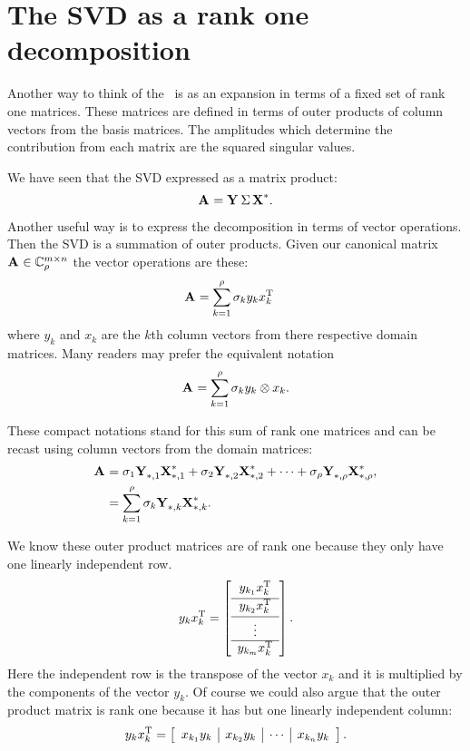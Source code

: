 \section{The SVD as a rank one decomposition}

Another way to think of the \svdp \ is as an expansion in terms of a fixed set of rank one matrices. These matrices are defined in terms of outer products of column vectors from the basis matrices. The amplitudes which determine the contribution from each matrix are the squared singular values.

We have seen that the SVD expressed as a matrix product:
\begin{equation*}
  \svdax{*}.
\end{equation*}

Another useful way is to express the decomposition in terms of vector operations. Then the SVD is a summation of outer products. Given our canonical matrix $\Accmn_{\rho}$ the vector operations are these:
\begin{equation}
  \begin{split}
    \A{} & = \sum_{k=1}^{\rho}{\sigma_{k}y_{k}x_{k}^{\mathrm{T}}}
  \end{split}
\end{equation}
where $y_{k}$ and $x_{k}$ are the $k$th column vectors from there respective domain matrices. 
Many readers may prefer the equivalent notation
\begin{equation}
  \A{} = \sum_{k=1}^{\rho}{\sigma_{k}y_{k}\otimes x_{k}}.
\end{equation}

These compact notations stand for this sum of rank one matrices and can be recast using column vectors from the domain matrices:
\begin{equation}
  \begin{split}
    \A{} &= \sigma_{1} \Y{}_{*,1}\X{*}_{*,1} + \sigma_{2} \Y{}_{*,2}\X{*}_{*,2} + \dots + \sigma_{\rho} \Y{}_{*,\rho}\X{*}_{*,\rho},\\
         &= \sum_{k=1}^{\rho}{\sigma_{k}\Y{}_{*,k}\X{*}_{*,k}}.
  \end{split}
\end{equation}

We know these outer product matrices are of rank one because they only have one linearly independent row.
\begin{equation}
  y_{k}x_{k}^{\mathrm{T}} = \mat{c}{y_{k_{1}}x_{k}^{\mathrm{T}}\\[2pt]\hline y_{k_{2}}x_{k}^{\mathrm{T}}\\[2pt]\hline \vdots\\\hline y_{k_{m}}x_{k}^{\mathrm{T}}}.
\end{equation}
Here the independent row is the transpose of the vector $x_{k}$ and it is multiplied by the components of the vector $y_{k}$. Of course we could also argue that the outer product matrix is rank one because it has but one linearly independent column:
\begin{equation}
  y_{k}x_{k}^{\mathrm{T}} = \mat{c|c|c|c}{ x_{k_{1}}y_{k} & x_{k_{2}}y_{k}& \cdots & x_{k_{n}}y_{k} }.
\end{equation}

